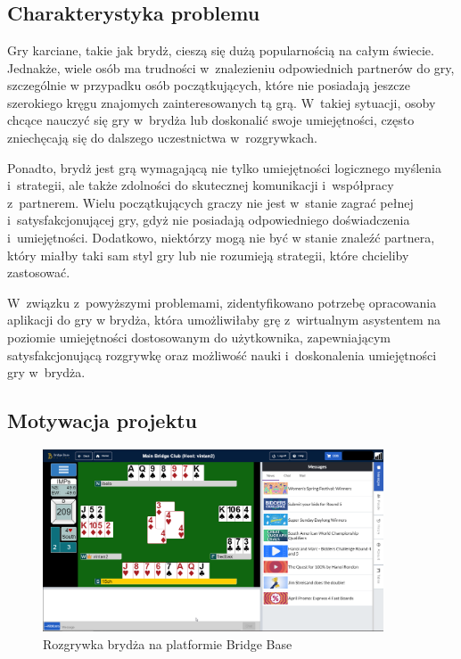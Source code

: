 \chapter{\ChapterTitleProjectVision}
\label{sec:cel-wizja}


\section{Charakterystyka problemu}

Gry karciane, takie jak brydż, cieszą się dużą popularnością na całym świecie.
Jednakże, wiele osób ma trudności w~znalezieniu odpowiednich partnerów do gry,
szczególnie w przypadku osób początkujących, które nie posiadają jeszcze
szerokiego kręgu znajomych zainteresowanych tą grą. W~takiej sytuacji, osoby
chcące nauczyć się gry w~brydża lub doskonalić swoje umiejętności, często
zniechęcają się do dalszego uczestnictwa w~rozgrywkach.

Ponadto, brydż jest grą wymagającą nie tylko umiejętności logicznego myślenia
i~strategii, ale także zdolności do skutecznej komunikacji i~współpracy
z~partnerem. Wielu początkujących graczy nie jest w~stanie zagrać pełnej
i~satysfakcjonującej gry, gdyż nie posiadają odpowiedniego doświadczenia
i~umiejętności. Dodatkowo, niektórzy mogą nie być w stanie znaleźć
partnera, który miałby taki sam styl gry lub nie rozumieją strategii,
które chcieliby zastosować.

W~związku z~powyższymi problemami, zidentyfikowano potrzebę opracowania
aplikacji do gry w brydża, która umożliwiłaby grę z~wirtualnym asystentem
na poziomie umiejętności dostosowanym do użytkownika, zapewniającym satysfakcjonującą
rozgrywkę oraz możliwość nauki i~doskonalenia umiejętności gry w~brydża.


\section{Motywacja projektu}

\begin{figure}
  \centering
  \includegraphics[width=0.9\textwidth]{img/brydz-platformy/bridgebase.png}
  \caption{Rozgrywka brydża na platformie Bridge Base}
  \label{fig:bridge-base}
\end{figure}

